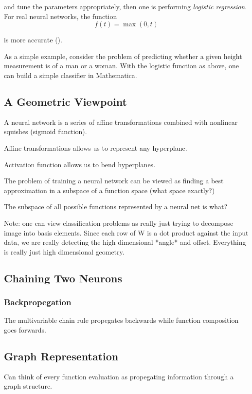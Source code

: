 \documentclass[12pt,letterpaper,boxed]{article}
\begin{document}
		and tune the parameters appropriately, then one is performing \textit{logistic regression}. For real neural networks, the function
		\[
			f(t) = \max(0, t)
		\]

		is more accurate (\cite{andrej2017}). 

		As a simple example, consider the problem of predicting whether a given height measurement is of a man or a woman. With the logistic function as above, one can build a simple classifier in Mathematica.


	\subsection{A Geometric Viewpoint}
		A neural network is a series of affine transformations combined with nonlinear squishes (sigmoid function).

		Affine transformations allows us to represent any hyperplane.

		Activation function allows us to bend hyperplanes.

		The problem of training a neural network can be viewed as finding a best approximation in a subspace of a function space (what space exactly?)

		The subspace of all possible functions represented by a neural net is what?

	Note: one can view classification problems as really just trying to decompose image into basis elements. Since each row of W is a dot product against the input data, we are really detecting the high dimensional *angle* and offset. Everything is really just high dimensional geometry.

	\subsection{Chaining Two Neurons}

		\subsubsection{Backpropegation}
			The multivariable chain rule propegates backwards while function composition goes forwards.

		\subsection{Graph Representation}
			Can think of every function evaluation as propegating information through a graph structure.
\end{document}
